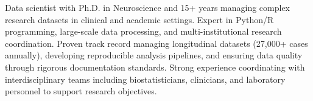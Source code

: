 

\begin{cvparagraph}


 Data scientist with Ph.D. in Neuroscience and 15+ years managing complex research datasets in clinical and academic settings. Expert in Python/R programming, large-scale data processing, and multi-institutional research coordination. Proven track record managing longitudinal datasets (27,000+ cases annually), developing reproducible analysis pipelines, and ensuring data quality through rigorous documentation standards. Strong experience coordinating with interdisciplinary teams including biostatisticians, clinicians, and laboratory personnel to support research objectives.
\end{cvparagraph}
